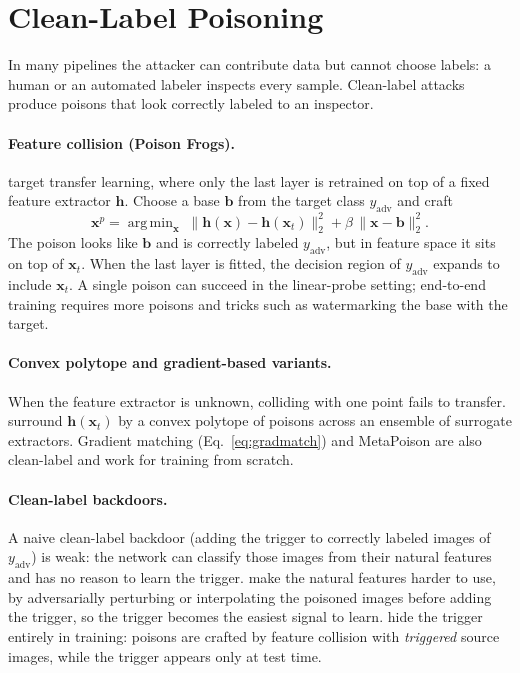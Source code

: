 \documentclass[10pt,a4paper]{extarticle}
\theoremstyle{definition}
\newcommand{\x}{\mathbf{x}}
\DeclareMathOperator*{\argmin}{arg\,min}
\begin{document}
\section{Clean-Label Poisoning}\label{sec:cleanlabel}

In many pipelines the attacker can contribute data but cannot choose labels: a human or an automated labeler inspects every sample. Clean-label attacks produce poisons that look correctly labeled to an inspector.

\paragraph{Feature collision (Poison Frogs).} \citet{shafahi2018poison} target transfer learning, where only the last layer is retrained on top of a fixed feature extractor \(\mathbf{h}\). Choose a base \(\mathbf{b}\) from the target class \(y_{\text{adv}}\) and craft
\begin{equation}\label{eq:collision}
\x^p = \argmin_{\x}\;\|\mathbf{h}(\x)-\mathbf{h}(\x_t)\|_2^2 + \beta\,\|\x-\mathbf{b}\|_2^2.
\end{equation}
The poison looks like \(\mathbf{b}\) and is correctly labeled \(y_{\text{adv}}\), but in feature space it sits on top of \(\x_t\). When the last layer is fitted, the decision region of \(y_{\text{adv}}\) expands to include \(\x_t\). A single poison can succeed in the linear-probe setting; end-to-end training requires more poisons and tricks such as watermarking the base with the target.

\paragraph{Convex polytope and gradient-based variants.} When the feature extractor is unknown, colliding with one point fails to transfer. \citet{zhu2019transferable} surround \(\mathbf{h}(\x_t)\) by a convex polytope of poisons across an ensemble of surrogate extractors. Gradient matching (Eq.~\ref{eq:gradmatch}) and MetaPoison \citep{huang2020metapoison} are also clean-label and work for training from scratch.

\paragraph{Clean-label backdoors.} A naive clean-label backdoor (adding the trigger to correctly labeled images of \(y_{\text{adv}}\)) is weak: the network can classify those images from their natural features and has no reason to learn the trigger. \citet{turner2019label} make the natural features harder to use, by adversarially perturbing or interpolating the poisoned images before adding the trigger, so the trigger becomes the easiest signal to learn. \citet{saha2020hidden} hide the trigger entirely in training: poisons are crafted by feature collision with \emph{triggered} source images, while the trigger appears only at test time.
\end{document}
